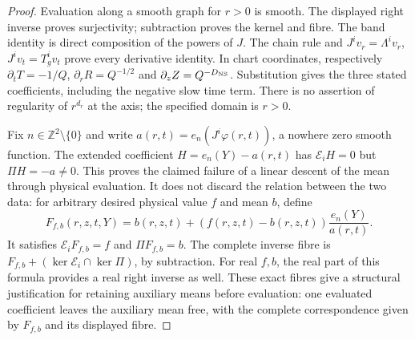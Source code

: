 \begin{proof}
Evaluation along a smooth graph for $r>0$ is smooth. The
displayed right inverse proves surjectivity; subtraction
proves the kernel and fibre. The band identity is direct
composition of the powers of $J$. The chain rule and
$J^iv_r=\Lambda^iv_r$, $J^iv_t=T_g^iv_t$ prove every
derivative identity. In chart coordinates, respectively
$\partial_tT=-1/Q$, $\partial_rR=Q^{-1/2}$ and
$\partial_zZ=Q^{-D_{\rm NS}}$. Substitution gives the
three stated coefficients, including the negative slow
time term. There is no assertion of regularity of
$r^{d_r}$ at the axis; the specified domain is $r>0$.

Fix $n\in\mathbb Z^2\setminus\{0\}$ and write
$a(r,t)=e_n(J^i\varphi(r,t))$, a nowhere zero smooth
function. The extended coefficient $H=e_n(Y)-a(r,t)$
has $\mathcal E_iH=0$ but $\Pi H=-a\ne0$.
This proves the claimed failure of a linear descent of
the mean through physical evaluation. It does not discard
the relation between the two data: for arbitrary desired
physical value $f$ and mean $b$, define
\[
 F_{f,b}(r,z,t,Y)=b(r,z,t)
       +(f(r,z,t)-b(r,z,t))\frac{e_n(Y)}{a(r,t)}.
\]
It satisfies $\mathcal E_iF_{f,b}=f$ and $\Pi F_{f,b}=b$.
The complete inverse fibre is
$F_{f,b}+(\ker\mathcal E_i\cap\ker\Pi)$, by subtraction.
For real $f,b$, the real part of this formula provides a
real right inverse as well. These exact fibres give a
structural justification for retaining auxiliary means
before evaluation: one evaluated coefficient leaves the
auxiliary mean free, with the complete correspondence
given by $F_{f,b}$ and its displayed fibre.
\end{proof}

